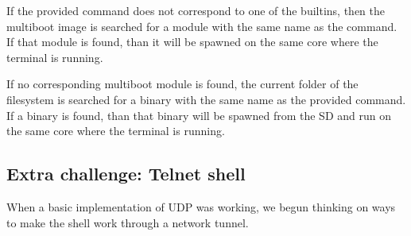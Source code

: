 \documentclass[a4paper,twoside,openright]{report}
\begin{document}
If the provided command does not correspond to one of the builtins, then the multiboot
image is searched for a module with the same name as the command. If that module is
found, than it will be spawned on the same core where the terminal is running.

If no corresponding multiboot module is found, the current folder of the filesystem
is searched for a binary with the same name as the provided command. If a binary is
found, than that binary will be spawned from the SD and run on the same core where
the terminal is running.

\subsection{Extra challenge: Telnet shell}
When a basic implementation of UDP was working, we begun thinking on ways to make
the shell work through a network tunnel.
\end{document}
